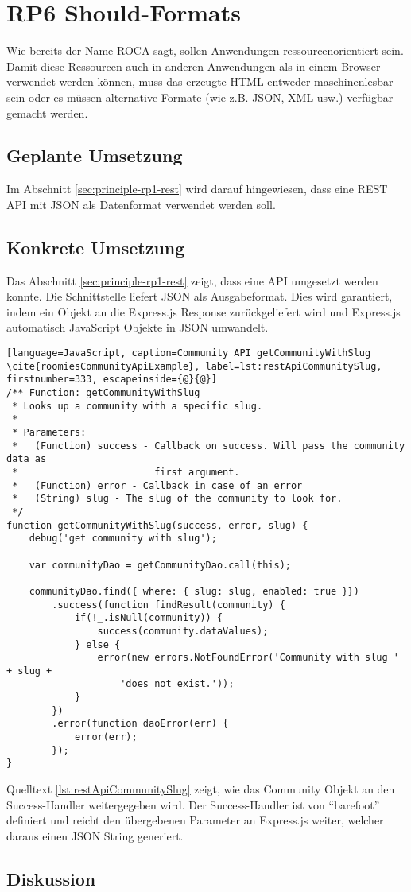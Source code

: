 \section{RP6 Should-Formats}
\label{sec:principle-rp6-should-formats}
Wie bereits der Name ROCA sagt, sollen Anwendungen ressourcenorientiert sein. Damit diese Ressourcen auch in anderen Anwendungen als in einem Browser verwendet werden können, muss das erzeugte HTML entweder maschinenlesbar sein oder es müssen alternative Formate (wie z.B. JSON, XML usw.) verfügbar gemacht werden.

\subsection*{Geplante Umsetzung}
Im Abschnitt \ref{sec:principle-rp1-rest}  wird darauf hingewiesen, dass eine REST API mit JSON als Datenformat verwendet werden soll.

\subsection*{Konkrete Umsetzung}
Das Abschnitt \ref{sec:principle-rp1-rest}  zeigt, dass eine API umgesetzt werden konnte.
Die Schnittstelle liefert JSON als Ausgabeformat. Dies wird garantiert, indem ein Objekt an die Express.js Response \cite{ExpressjsResSend} zurückgeliefert wird und Express.js automatisch JavaScript Objekte in JSON umwandelt.

\begin{lstlisting}[language=JavaScript, caption=Community API getCommunityWithSlug \cite{roomiesCommunityApiExample}, label=lst:restApiCommunitySlug, firstnumber=333, escapeinside={@}{@}]
/** Function: getCommunityWithSlug
 * Looks up a community with a specific slug.
 *
 * Parameters:
 *   (Function) success - Callback on success. Will pass the community data as
 *                        first argument.
 *   (Function) error - Callback in case of an error
 *   (String) slug - The slug of the community to look for.
 */
function getCommunityWithSlug(success, error, slug) {
	debug('get community with slug');

	var communityDao = getCommunityDao.call(this);

	communityDao.find({ where: { slug: slug, enabled: true }})
		.success(function findResult(community) {
			if(!_.isNull(community)) {
				success(community.dataValues);
			} else {
				error(new errors.NotFoundError('Community with slug ' + slug +
					'does not exist.'));
			}
		})
		.error(function daoError(err) {
			error(err);
		});
}
\end{lstlisting}

Quelltext \ref{lst:restApiCommunitySlug} zeigt, wie das Community Objekt an den Success-Handler weitergegeben wird. Der Success-Handler ist von ``barefoot'' definiert und reicht den übergebenen Parameter an Express.js weiter, welcher daraus einen JSON String generiert.

\subsection*{Diskussion}
